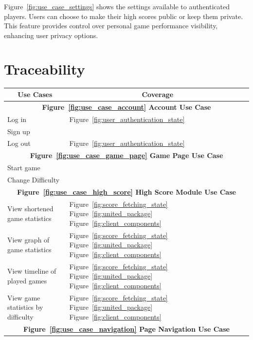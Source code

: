 \documentclass[11pt,a4paper]{article}
\begin{document}
Figure~\ref{fig:use_case_settings} shows the settings available to
authenticated players. Users can choose to make their high scores public
or keep them private. This feature provides control over personal game
performance visibility, enhancing user privacy options.


\section{Traceability}

\begin{table}
\begin{tabular}{|l|l|}
\hline
\multicolumn{1}{|c|}{\textbf{Use Cases}}    & \multicolumn{1}{|c|}{\textbf{Coverage}}                   \\ \hline
\multicolumn{2}{|c|}{\textbf {Figure~\ref{fig:use_case_account} Account Use Case} }                                          \\ \hline
Log in& Figure~\ref{fig:user_authentication_state}\\
Sign up& \\
Log out& Figure~\ref{fig:user_authentication_state}\\
\hline
\multicolumn{2}{|c|}{\textbf {Figure~\ref{fig:use_case_game_page} Game Page Use Case} }                                      \\
\hline
Start game& \\
Change Difficulty& \\
\hline
\multicolumn{2}{|c|}{\textbf {Figure~\ref{fig:use_case_high_score} High Score Module Use Case} }                                         \\
\hline
View shortened game statistics& Figure~\ref{fig:score_fetching_state} Figure~\ref{fig:united_package} Figure~\ref{fig:client_components} \\
View graph of game statistics& Figure~\ref{fig:score_fetching_state} Figure~\ref{fig:united_package} Figure~\ref{fig:client_components} \\
View timeline of played games& Figure~\ref{fig:score_fetching_state} Figure~\ref{fig:united_package} Figure~\ref{fig:client_components} \\
View game statistics by difficulty& Figure~\ref{fig:score_fetching_state} Figure~\ref{fig:united_package} Figure~\ref{fig:client_components} \\
\hline
\multicolumn{2}{|c|}{\textbf {Figure~\ref{fig:use_case_navigation} Page Navigation Use Case} }                          \\

\end{tabular}
\end{table}
\end{document}
